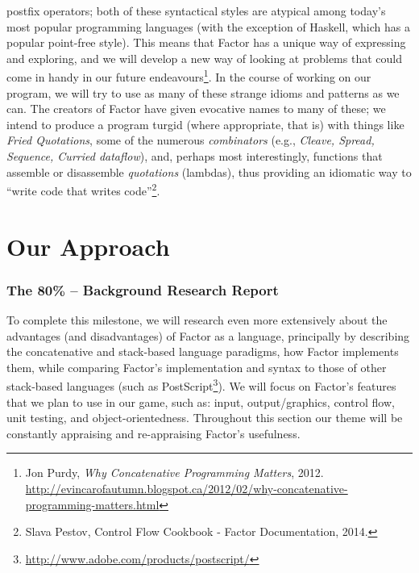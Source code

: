 \documentclass{sig-alternate}
\begin{document}
postfix operators; both of these syntactical styles are atypical among
today's most popular programming languages (with the exception of
Haskell, which has a popular point-free style). This means that Factor
has a unique way of expressing and exploring, and we will develop a
new way of looking at problems that could come in handy in our future
endeavours\footnote{Jon Purdy, \textit{Why Concatenative Programming Matters}, 2012. \url{http://evincarofautumn.blogspot.ca/2012/02/why-concatenative-programming-matters.html}}. In the course of working on our program, we will try to
use as many of these strange idioms and patterns as we can. The
creators of Factor have given evocative names to many of these; we
intend to produce a program turgid (where appropriate, that is) with
things like  \textit{Fried Quotations}, some of the numerous
\textit{combinators} (e.g., \textit{Cleave, Spread, Sequence, Curried
dataflow}), and, perhaps most interestingly, functions that assemble
or disassemble \textit{quotations} (lambdas), thus providing an
idiomatic way to ``write code that writes code''\footnote{Slava Pestov, Control Flow Cookbook - Factor Documentation, 2014. 
}.

\section{Our Approach}
\subsubsection*{The 80\% -- Background Research Report}
To complete this milestone, we will research even more
extensively about the advantages (and disadvantages) of Factor as a
language, principally by describing the concatenative and stack-based language paradigms, how Factor implements them, while comparing Factor's implementation and syntax to those of other stack-based languages (such as PostScript\footnote{\url{http://www.adobe.com/products/postscript/}}). We will focus on Factor's features that we plan to use in our game, such as: input, output/graphics, control flow, unit testing, and object-orientedness. Throughout this section our theme will be constantly appraising and re-appraising Factor's usefulness.
\end{document}
